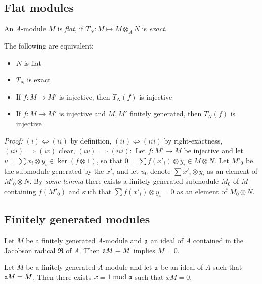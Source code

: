 \subsection{Flat modules}
\begin{definition}
    An $A$-module $M$ is \textit{flat}, if $T_N: M \mapsto M \otimes_A N$ is \textit{exact}.
\end{definition}

\begin{theorem}The following are equivalent:
    \begin{itemize}
        \item $N$ is flat
        \item $T_N$ is exact
        \item If $f:M \rightarrow M'$ is injective, then $T_N(f)$ is injective
        \item If $f:M \rightarrow M'$ is injective and $M,M'$ finitely generated, then $T_N(f)$ is injective
    \end{itemize}
\end{theorem}
\textit{Proof:}
$(i) \iff (ii)$ by definition, $(ii)\iff (iii)$ by right-exactness, $(iii)\implies (iv)$ clear, $(iv)\implies (iii):$ Let $f: M' \rightarrow M$ be injective and let $u = \sum x_i \otimes y_i \in \ker(f\otimes 1)$, so that $0=\sum f(x'_i)\otimes y_i \in M\otimes N$. Let $M'_0$ be the submodule generated by the $x'_i$ and let $u_0$ denote $\sum x'_i \otimes y_i$ as an element of $M'_0 \otimes N$. By \textit{some lemma} there exists a finitely generated submodule $M_0$ of $M$ containing $f(M'_0)$ and such that $\sum f(x'_i)\otimes y_i = 0$ as an element of $M_0 \otimes N$.

\subsection{Finitely generated modules}

\begin{theorem}
    Let $M$ be a finitely generated $A$-module and $\mathfrak{a}$ an ideal of $A$ contained in the Jacobson radical $\mathfrak{R}$ of $A$. Then $\mathfrak{a} M = M$ implies $M=0$.
\end{theorem}


\begin{lemma}
    Let $M$ be a finitely generated $A$-module and let $\mathfrak{a}$ be an ideal of $A$ such that $\mathfrak{a} M = M$. Then there exists $x\equiv 1\bmod{\mathfrak{a}}$ such that $xM=0$.
\end{lemma}

